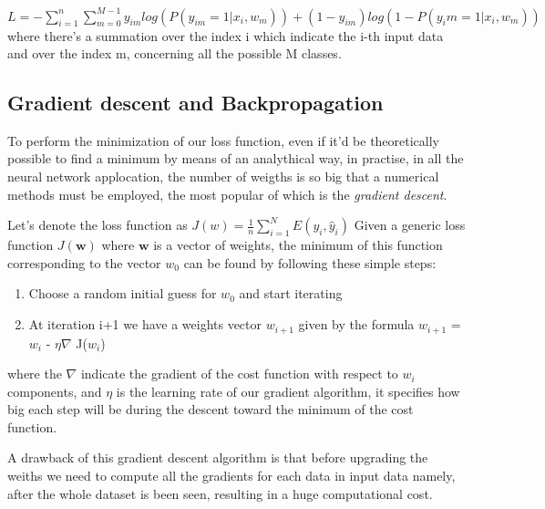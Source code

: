 \documentclass[a4paper,11pt]{article}
\begin{document}
$L = -\sum_{i=1}^{n} \sum_{m= 0}^{M-1} y_{im} log(P(y_{im}=1|x_i, w_m)) + (1-y_{im})log(1-P(y_im=1|x_i, w_m))  $
where there's a summation over the index i which indicate the i-th input data and over the index m, concerning all the possible M classes.

\subsection{Gradient descent and Backpropagation}

To perform the minimization of our loss function, even if it'd be theoretically possible to find a minimum by means of an analythical way, in practise, in all the neural network applocation, the number of weigths is so big that a numerical methods must be employed, the most popular of which is the \emph{gradient descent}.

Let's denote the loss function as $J(w) = \frac{1}{n}\sum_{i = 1}^N E(y_i, \hat y_i)$
Given a generic loss function $J(\textbf{w})$ where $\textbf{w}$ is a vector of weights, the minimum of this function corresponding to the vector $w_0$ can be found by following these simple steps:

\begin{enumerate}
\item Choose a random initial guess for \textbf{$w_0$} and start iterating
\item At iteration i+1 we have a weights vector \textbf{$w_{i+1}$} given by the formula \textbf{$w_{i+1}$} = \textbf{$w_i$} - $\eta \nabla$ J(\textbf{$w_i$})
\end{enumerate}

 where the $\nabla$ indicate the gradient of the cost function with respect to \textbf{$w_i$} components, and $\eta$ is the learning rate of our gradient algorithm, it specifies how big each step will be during the descent toward the minimum of the cost function.


A drawback of this gradient descent algorithm is that before upgrading the weiths we need to compute all the gradients for each data in input data namely, after the whole dataset is been seen, resulting in a huge computational cost.
\end{document}
